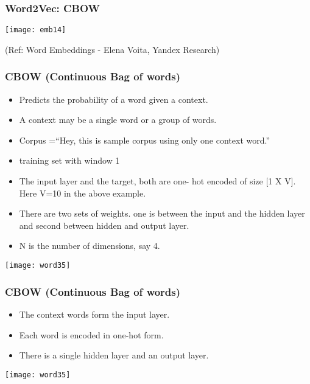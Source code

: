 

\begin{frame}[fragile]\frametitle{Word2Vec: CBOW}
\begin{center}
\texttt{[image: emb14]}
\end{center}

{\tiny (Ref: Word Embeddings - Elena Voita, Yandex Research)}
\end{frame}


\begin{frame}[fragile]\frametitle{CBOW (Continuous Bag of words)}
\begin{itemize}
\item Predicts the probability of a word given a context. 
\item A context may be a single word or a group of words. 
\item  Corpus =``Hey, this is sample corpus using only one context word.''
\item training set with window 1
\item The input layer and the target, both are one- hot encoded of size [1 X V]. Here V=10 in the above example.
\item There are two sets of weights. one is between the input and the hidden layer and second between hidden and output layer.
\item N is the number of dimensions, say 4.
\end{itemize}
\begin{center}
\texttt{[image: word35]}
\end{center}
\end{frame}

\begin{frame}[fragile]\frametitle{CBOW (Continuous Bag of words)}
\begin{itemize}
\item The context words form the input layer. 
\item Each word is encoded in one-hot form.
\item There is a single hidden layer and an output layer.
\end{itemize}
\begin{center}
\texttt{[image: word35]}
\end{center}

\end{frame}

